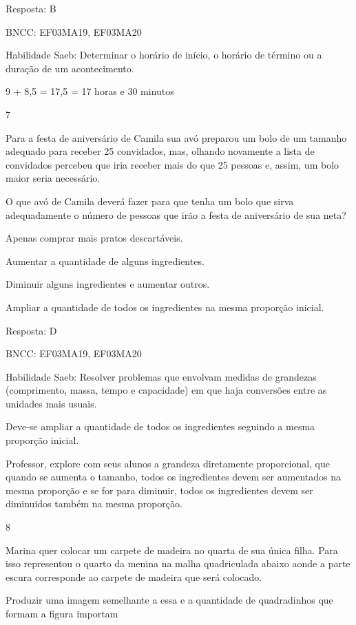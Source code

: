 \begin{escolha}
Resposta: B

BNCC: EF03MA19, EF03MA20

Habilidade Saeb: Determinar o horário de início, o horário de término ou
a duração de um acontecimento.

9 + 8,5 = 17,5 = 17 horas e 30 minutos

\num{7}

Para a festa de aniversário de Camila sua avó preparou um bolo de um
tamanho adequado para receber 25 convidados, mas, olhando novamente a
lista de convidados percebeu que iria receber mais do que 25 pessoas e,
assim, um bolo maior seria necessário.

O que avó de Camila deverá fazer para que tenha um bolo que sirva
adequadamente o número de pessoas que irão a festa de aniversário de sua
neta?

\begin{escolha}
\item
  Apenas comprar mais pratos descartáveis.
\item
  Aumentar a quantidade de alguns ingredientes.
\item
  Diminuir alguns ingredientes e aumentar outros.
\item
  Ampliar a quantidade de todos os ingredientes na mesma proporção
  inicial.
\end{escolha}

Resposta: D

BNCC: EF03MA19, EF03MA20

Habilidade Saeb: Resolver problemas que envolvam medidas de grandezas
(comprimento, massa, tempo e capacidade) em que haja conversões entre as
unidades mais usuais.

Deve-se ampliar a quantidade de todos os ingredientes seguindo a mesma
proporção inicial.

Professor, explore com seus alunos a grandeza diretamente proporcional,
que quando se aumenta o tamanho, todos os ingredientes devem ser
aumentados na mesma proporção e se for para diminuir, todos os
ingredientes devem ser diminuidos também na mesma proporção.

\num{8}

Marina quer colocar um carpete de madeira no quarta de sua única filha.
Para isso representou o quarto da menina na malha quadriculada abaixo
aonde a parte escura corresponde ao carpete de madeira que será
colocado.

Produzir uma imagem semelhante a essa e a quantidade de quadradinhos que
formam a figura importam


\end{escolha}

